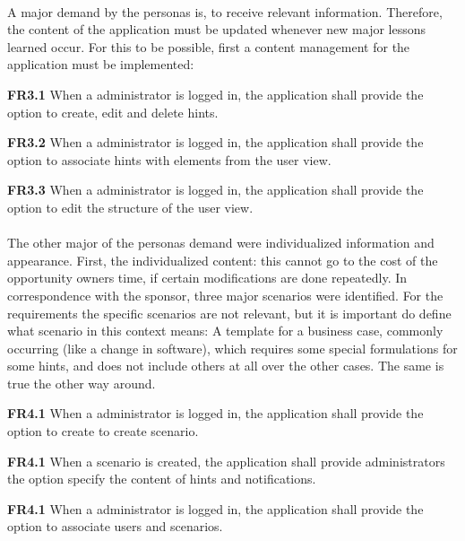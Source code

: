 \paragraph{} A major demand by the personas is, to receive relevant information. Therefore, the content of the application must be updated whenever new major lessons learned occur. For this to be possible, first a content management for the application must be implemented:

\begin{closeItem}
    \item [\textbf{FR3.1}] When a administrator is logged in, the application shall provide the option to create, edit and delete hints.
    \item [\textbf{FR3.2}] When a administrator is logged in, the application shall provide the option to associate hints with elements from the user view.
    \item [\textbf{FR3.3}] When a administrator is logged in, the application shall provide the option to edit the structure of the user view.
\end{closeItem}

\paragraph{} The other major of the personas demand were individualized information and appearance. First, the individualized content: this cannot go to the cost of the opportunity owners time, if certain modifications are done repeatedly. In correspondence with the sponsor, three major scenarios were identified. For the requirements the specific scenarios are not relevant, but it is important do define what scenario in this context means: A template for a business case, commonly occurring (like a change in software), which requires some special formulations for some hints, and does not include others at all over the other cases. The same is true the other way around. 

\begin{closeItem}
    \item [\textbf{FR4.1}] When a administrator is logged in, the application shall provide the option to create to create  scenario.
    \item [\textbf{FR4.1}] When a scenario is created, the application shall provide administrators the option specify the content of hints and notifications.
     \item [\textbf{FR4.1}] When a administrator is logged in, the application shall provide the option to associate users and scenarios.
\end{closeItem}

